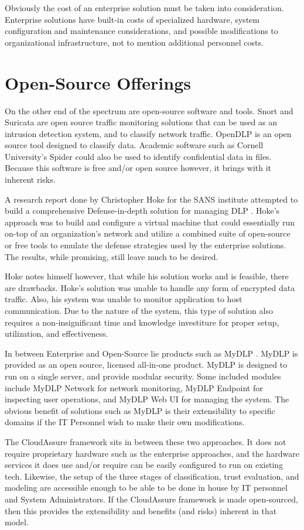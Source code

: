 Obviously the cost
of an enterprise solution must be taken into consideration. Enterprise solutions
have built-in costs of specialized hardware, system configuration and
maintenance considerations, and possible modifications to organizational
infrastructure, not to mention additional personnel costs.  

\section{Open-Source Offerings}
On the other end of
the spectrum are open-source software and tools. Snort \autocite{Parker2013} and
Suricata \autocite{Jonkman2013}
are open source traffic monitoring solutions that can be used as an intrusion
detection system, and to classify network traffic. OpenDLP \autocite{Gavin2012} is an open
source tool designed to classify data. Academic software such as Cornell
University's Spider \autocite{Cornell2013} could also be used to identify confidential data in
files. Because this software is free and/or open source however, it brings with
it inherent risks.  

A research report done by Christopher Hoke for the SANS
institute attempted to build a comprehensive Defense-in-depth solution for
managing \gls{DLP} \autocite{Hoke2012}.  Hoke's approach was to build and configure a virtual
machine that could essentially run on-top of an organization's network and
utilize a combined suite of open-source or free tools to emulate the defense
strategies used by the enterprise solutions. The results, while promising, still
leave much to be desired.  

Hoke notes himself however, that while his solution
works and is feasible, there are drawbacks. Hoke's solution was unable to handle
any form of encrypted data traffic. Also, his system was unable to monitor
application to host communication. Due to the nature of the system, this type of
solution also requires a non-insignificant time and knowledge investiture for
proper setup, utilization, and effectiveness.  

In between Enterprise and
Open-Source lie products such as MyDLP \autocite{MyDLP2013}. MyDLP is provided as an open
source, licensed all-in-one product. MyDLP is designed to run on a single
server, and provide modular security. Some included modules include MyDLP
Network for network monitoring, MyDLP Endpoint for inspecting user operations,
and MyDLP Web UI for managing the system. The obvious benefit of solutions such
as MyDLP is their extensibility to specific domains if the IT Personnel wish to
make their own modifications.  

The CloudAssure framework sits in between these
two approaches. It does not require proprietary hardware such as the enterprise
approaches, and the hardware services it does use and/or require can be easily
configured to run on existing tech. Likewise, the setup of the three stages of
classification, trust evaluation, and modeling are accessible enough to be able
to be done in house by IT personnel and System Administrators. If the
CloudAssure framework is made open-sourced, then this provides the extensibility
and benefits (and risks) inherent in that model. 

